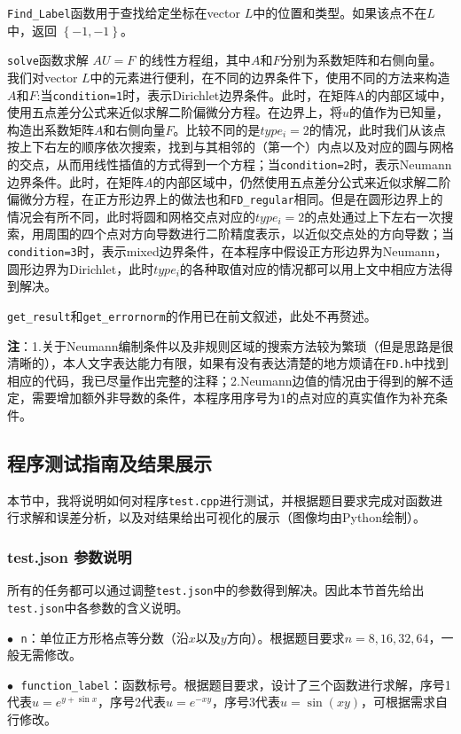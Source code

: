 \documentclass{ctexart}
\begin{document}
\begin{sloppypar}
\verb|Find_Label|函数用于查找给定坐标在vector $L$中的位置和类型。如果该点不在$L$中，返回 $\left\{-1,-1\right\}$。

\verb|solve|函数求解 $AU = F$ 的线性方程组，其中$A$和$F$分别为系数矩阵和右侧向量。我们对vector $L$中的元素进行便利，在不同的边界条件下，使用不同的方法来构造$A$和$F$:当\verb|condition=1|时，表示Dirichlet边界条件。此时，在矩阵A的内部区域中，使用五点差分公式来近似求解二阶偏微分方程。在边界上，将$u$的值作为已知量，构造出系数矩阵$A$和右侧向量$F$。比较不同的是$type_i=2$的情况，此时我们从该点按上下右左的顺序依次搜索，找到与其相邻的（第一个）内点以及对应的圆与网格的交点，从而用线性插值的方式得到一个方程；当\verb|condition=2|时，表示Neumann边界条件。此时，在矩阵$A$的内部区域中，仍然使用五点差分公式来近似求解二阶偏微分方程，在正方形边界上的做法也和\verb|FD_regular|相同。但是在圆形边界上的情况会有所不同，此时将圆和网格交点对应的$type_i=2$的点处通过上下左右一次搜索，用周围的四个点对方向导数进行二阶精度表示，以近似交点处的方向导数；当\verb|condition=3|时，表示mixed边界条件，在本程序中假设正方形边界为Neumann，圆形边界为Dirichlet，此时$type_i$的各种取值对应的情况都可以用上文中相应方法得到解决。

\verb|get_result|和\verb|get_errornorm|的作用已在前文叙述，此处不再赘述。

\textbf{注}：1.关于Neumann编制条件以及非规则区域的搜索方法较为繁琐（但是思路是很清晰的），本人文字表达能力有限，如果有没有表达清楚的地方烦请在\verb|FD.h|中找到相应的代码，我已尽量作出完整的注释；2.Neumann边值的情况由于得到的解不适定，需要增加额外非导数的条件，本程序用序号为1的点对应的真实值作为补充条件。

\subsection{程序测试指南及结果展示}
本节中，我将说明如何对程序\verb|test.cpp|进行测试，并根据题目要求完成对函数进行求解和误差分析，以及对结果给出可视化的展示（图像均由Python绘制）。

\subsubsection{test.json 参数说明}
所有的任务都可以通过调整\verb|test.json|中的参数得到解决。因此本节首先给出\verb|test.json|中各参数的含义说明。

$\bullet \;$ \verb|n|：单位正方形格点等分数（沿$x$以及$y$方向）。根据题目要求$n=8,16,32,64$，一般无需修改。

$\bullet \;$ \verb|function_label|：函数标号。根据题目要求，设计了三个函数进行求解，序号1代表$u = e^{y+\sin x}$，序号2代表$u = e^{-xy}$，序号3代表$u = \sin(xy)$，可根据需求自行修改。


\end{sloppypar}
\end{document}
